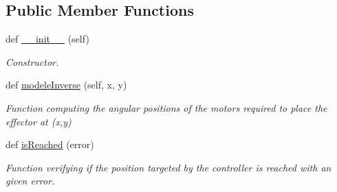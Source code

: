 \subsection*{Public Member Functions}
\begin{DoxyCompactItemize}
\item 
def \hyperlink{classwakanda_1_1Wakanda_a27ff7fb9ac3819931b93481588fb1e9f}{\+\_\+\+\_\+init\+\_\+\+\_\+} (self)\hypertarget{classwakanda_1_1Wakanda_a27ff7fb9ac3819931b93481588fb1e9f}{}\label{classwakanda_1_1Wakanda_a27ff7fb9ac3819931b93481588fb1e9f}

\begin{DoxyCompactList}\small\item\em Constructor. \end{DoxyCompactList}\item 
def \hyperlink{classwakanda_1_1Wakanda_a2240de179408dbc71c6892200cf5db1e}{modele\+Inverse} (self, x, y)
\begin{DoxyCompactList}\small\item\em Function computing the angular positions of the motors required to place the effector at (x,y) \end{DoxyCompactList}\item 
def \hyperlink{classwakanda_1_1Wakanda_ad7500c0f1ad6d9e44a391a0951c29e0e}{is\+Reached} (error)
\begin{DoxyCompactList}\small\item\em Function verifying if the position targeted by the controller is reached with an given error. \end{DoxyCompactList}\end{DoxyCompactItemize}
